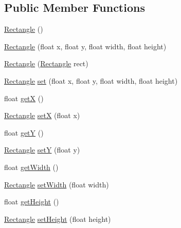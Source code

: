 \subsection*{Public Member Functions}
\begin{DoxyCompactItemize}
\item 
\hyperlink{classairhockeyjava_1_1util_1_1_rectangle_a704e268c241e7d85022a2ba96d6798a1}{Rectangle} ()
\item 
\hyperlink{classairhockeyjava_1_1util_1_1_rectangle_a02a194c70180ef962221160fa5221fff}{Rectangle} (float x, float y, float width, float height)
\item 
\hyperlink{classairhockeyjava_1_1util_1_1_rectangle_a5224f2caeec6d8291073da8d25f333f9}{Rectangle} (\hyperlink{classairhockeyjava_1_1util_1_1_rectangle}{Rectangle} rect)
\item 
\hyperlink{classairhockeyjava_1_1util_1_1_rectangle}{Rectangle} \hyperlink{classairhockeyjava_1_1util_1_1_rectangle_ac9aa34c20ddd03b5d3e7f2b7f5924eb4}{set} (float x, float y, float width, float height)
\item 
float \hyperlink{classairhockeyjava_1_1util_1_1_rectangle_a59c5c99d2667bddfe1ca49639e59b71c}{get\+X} ()
\item 
\hyperlink{classairhockeyjava_1_1util_1_1_rectangle}{Rectangle} \hyperlink{classairhockeyjava_1_1util_1_1_rectangle_af97f324183d316f7937e56f7085d653a}{set\+X} (float x)
\item 
float \hyperlink{classairhockeyjava_1_1util_1_1_rectangle_a8058952e79205bfe234b731f86bd8b1b}{get\+Y} ()
\item 
\hyperlink{classairhockeyjava_1_1util_1_1_rectangle}{Rectangle} \hyperlink{classairhockeyjava_1_1util_1_1_rectangle_a338dce61b19e487501719b6227e5ad4a}{set\+Y} (float y)
\item 
float \hyperlink{classairhockeyjava_1_1util_1_1_rectangle_a622e75c0274201a9b38fa4d5818ef00d}{get\+Width} ()
\item 
\hyperlink{classairhockeyjava_1_1util_1_1_rectangle}{Rectangle} \hyperlink{classairhockeyjava_1_1util_1_1_rectangle_af3a4a8d1f3b5a0f011b2afdb1eaa4394}{set\+Width} (float width)
\item 
float \hyperlink{classairhockeyjava_1_1util_1_1_rectangle_aaed0422e0b47fd839b3df831b5ba1bfa}{get\+Height} ()
\item 
\hyperlink{classairhockeyjava_1_1util_1_1_rectangle}{Rectangle} \hyperlink{classairhockeyjava_1_1util_1_1_rectangle_ad719f5ed1673be7bf9bd4638fd667b48}{set\+Height} (float height)
\item 

\end{DoxyCompactItemize}

